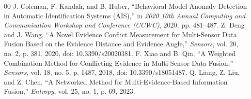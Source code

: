 \documentclass[conference]{IEEEtran}
\begin{document}
\begin{thebibliography}{00}
 J. Coleman, F. Kandah, and B. Huber, ``Behavioral Model Anomaly Detection in Automatic Identification Systems (AIS),'' in \textit{2020 10th Annual Computing and Communication Workshop and Conference (CCWC)}, 2020, pp. 481--487.
 Z. Deng and J. Wang, ``A Novel Evidence Conflict Measurement for Multi-Sensor Data Fusion Based on the Evidence Distance and Evidence Angle,'' \textit{Sensors}, vol. 20, no. 2, p. 381, 2020, doi: 10.3390/s20020381.
 F. Xiao and B. Qin, ``A Weighted Combination Method for Conflicting Evidence in Multi-Sensor Data Fusion,'' \textit{Sensors}, vol. 18, no. 5, p. 1487, 2018, doi: 10.3390/s18051487.
 Q. Liang, Z. Liu, and Z. Chen, ``A Networked Method for Multi-Evidence-Based Information Fusion,'' \textit{Entropy}, vol. 25, no. 1, p. 69, 2023.
\end{thebibliography}
\end{document}
